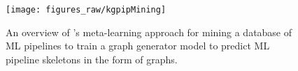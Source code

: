 \begin{figure}
\ncp\ncp
 \centering
   \texttt{[image: figures\_raw/kgpipMining]} 
  \ncp\ncp\ncp\ncp\ncp\ncp
  \caption{An overview of {\sysname}'s meta-learning approach for mining a database of ML pipelines to train a graph generator model to predict ML pipeline skeletons in the form of graphs.}
  \ncp\ncp\ncp\ncp\ncp\ncp
  \label{fig:mining}
\end{figure}